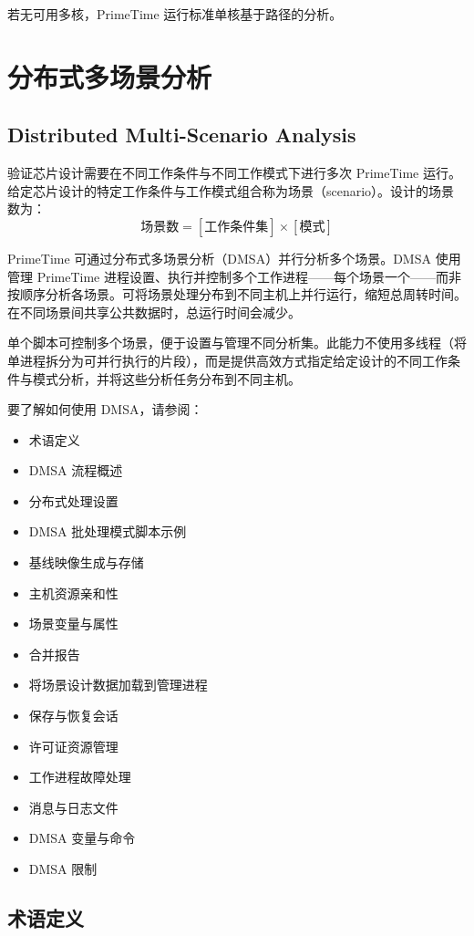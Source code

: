 若无可用多核，PrimeTime 运行标准单核基于路径的分析。


\section{分布式多场景分析}
\subsection*{Distributed Multi-Scenario Analysis}

验证芯片设计需要在不同工作条件与不同工作模式下进行多次 PrimeTime 运行。给定芯片设计的特定工作条件与工作模式组合称为场景（scenario）。设计的场景数为：
\[
\text{场景数} = [\text{工作条件集}] \times [\text{模式}]
\]

PrimeTime 可通过分布式多场景分析（DMSA）并行分析多个场景。DMSA 使用管理 PrimeTime 进程设置、执行并控制多个工作进程——每个场景一个——而非按顺序分析各场景。可将场景处理分布到不同主机上并行运行，缩短总周转时间。在不同场景间共享公共数据时，总运行时间会减少。

单个脚本可控制多个场景，便于设置与管理不同分析集。此能力不使用多线程（将单进程拆分为可并行执行的片段），而是提供高效方式指定给定设计的不同工作条件与模式分析，并将这些分析任务分布到不同主机。

要了解如何使用 DMSA，请参阅：
\begin{itemize}
  \item 术语定义
  \item DMSA 流程概述
  \item 分布式处理设置
  \item DMSA 批处理模式脚本示例
  \item 基线映像生成与存储
  \item 主机资源亲和性
  \item 场景变量与属性
  \item 合并报告
  \item 将场景设计数据加载到管理进程
  \item 保存与恢复会话
  \item 许可证资源管理
  \item 工作进程故障处理
  \item 消息与日志文件
  \item DMSA 变量与命令
  \item DMSA 限制
\end{itemize}

\subsection{术语定义}
